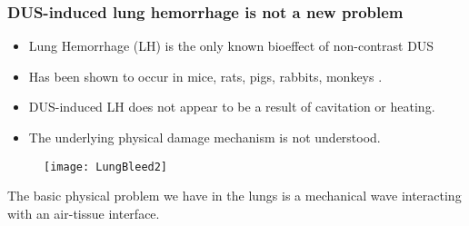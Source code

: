 \begin{frame} \frametitle{\vspace*{0.5cm}DUS-induced lung hemorrhage is not a new problem}
  {\small%
    \begin{itemize}%
    \item Lung Hemorrhage (LH) is the only known bioeffect of non-contrast DUS%
    \item Has been shown to occur in mice, rats, pigs, rabbits, monkeys \citep{Child1990,OBrien1997a,Tarantal1994a}.%
    \item DUS-induced LH does not appear to be a result of cavitation or heating.%
    \item The underlying physical damage mechanism is not understood.%
    \end{itemize}%
    \begin{figure}%
      \centering%
      \texttt{[image: LungBleed2]} \nocite{Miller2012}%
    \end{figure}%
    The basic physical problem we have in the lungs is a mechanical wave interacting with an air-tissue interface.
  }
\end{frame}

